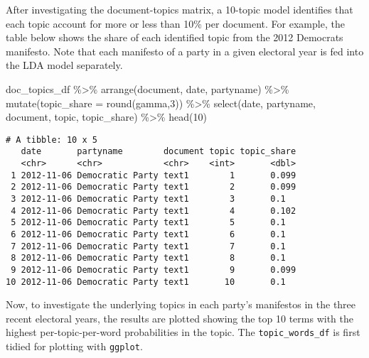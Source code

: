 \documentclass[
]{article}
\newenvironment{Shaded}{\begin{snugshade}}{\end{snugshade}}
\newcommand{\AttributeTok}[1]{\textcolor[rgb]{0.77,0.63,0.00}{#1}}
\newcommand{\DecValTok}[1]{\textcolor[rgb]{0.00,0.00,0.81}{#1}}
\newcommand{\FunctionTok}[1]{\textcolor[rgb]{0.00,0.00,0.00}{#1}}
\newcommand{\NormalTok}[1]{#1}
\newcommand{\SpecialCharTok}[1]{\textcolor[rgb]{0.00,0.00,0.00}{#1}}
\begin{document}
After investigating the document-topics matrix, a 10-topic model
identifies that each topic account for more or less than 10\% per
document. For example, the table below shows the share of each
identified topic from the 2012 Democrats manifesto. Note that each
manifesto of a party in a given electoral year is fed into the LDA model
separately.

\begin{Shaded}
\begin{Highlighting}[]
\NormalTok{doc\_topics\_df }\SpecialCharTok{\%\textgreater{}\%}
  \FunctionTok{arrange}\NormalTok{(document, date, partyname) }\SpecialCharTok{\%\textgreater{}\%}
  \FunctionTok{mutate}\NormalTok{(}\AttributeTok{topic\_share =} \FunctionTok{round}\NormalTok{(gamma,}\DecValTok{3}\NormalTok{)) }\SpecialCharTok{\%\textgreater{}\%}
  \FunctionTok{select}\NormalTok{(date, partyname, document, topic, topic\_share) }\SpecialCharTok{\%\textgreater{}\%}
  \FunctionTok{head}\NormalTok{(}\DecValTok{10}\NormalTok{)}
\end{Highlighting}
\end{Shaded}

\begin{verbatim}
# A tibble: 10 x 5
   date       partyname        document topic topic_share
   <chr>      <chr>            <chr>    <int>       <dbl>
 1 2012-11-06 Democratic Party text1        1       0.099
 2 2012-11-06 Democratic Party text1        2       0.099
 3 2012-11-06 Democratic Party text1        3       0.1  
 4 2012-11-06 Democratic Party text1        4       0.102
 5 2012-11-06 Democratic Party text1        5       0.1  
 6 2012-11-06 Democratic Party text1        6       0.1  
 7 2012-11-06 Democratic Party text1        7       0.1  
 8 2012-11-06 Democratic Party text1        8       0.1  
 9 2012-11-06 Democratic Party text1        9       0.099
10 2012-11-06 Democratic Party text1       10       0.1  
\end{verbatim}

Now, to investigate the underlying topics in each party's manifestos in
the three recent electoral years, the results are plotted showing the
top 10 terms with the highest per-topic-per-word probabilities in the
topic. The \texttt{topic\_words\_df} is first tidied for plotting with
\texttt{ggplot}.
\end{document}
